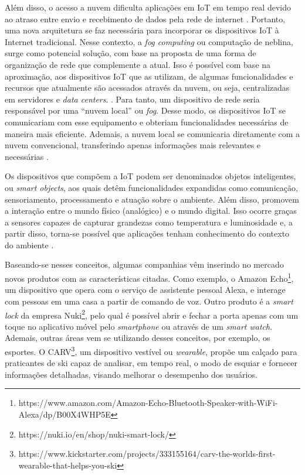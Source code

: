Além disso, o acesso a nuvem dificulta aplicações em IoT em tempo real devido ao atraso entre envio e recebimento de dados pela rede de internet \cite{Syed2016}.
Portanto, uma nova arquitetura se faz necessária para incorporar os dispositivos IoT à Internet tradicional. 
Nesse contexto, a \textit{fog computing} ou computação de neblina, surge como potencial solução, com base na proposta de uma forma de organização de rede que complemente a atual. Isso é possível com base na aproximação, aos dispositivos IoT que as utilizam, de algumas funcionalidades e recursos que atualmente são acessados através da nuvem, ou seja, centralizadas em servidores e \textit{data centers}.
\cite{Chiang2016}. Para tanto, um dispositivo de rede seria responsável por uma ``nuvem local'' ou \textit{fog}. Desse modo, os dispositivos IoT se comunicariam com esse equipamento e obteriam funcionalidades necessárias de maneira mais eficiente. Ademais, a nuvem local se comunicaria diretamente com a nuvem convencional, transferindo apenas informações mais relevantes e necessárias \cite{Syed2016}.

Os dispositivos que compõem a IoT podem ser denominados objetos inteligentes, ou \textit{smart objects}, aos quais detêm funcionalidades expandidas como comunicação, sensoriamento, processamento e atuação sobre o ambiente. Além disso, promovem a interação entre o mundo físico (analógico) e o mundo digital. Isso ocorre graças a sensores capazes de capturar grandezas como temperatura e luminosidade e, a partir disso, torna-se possível que aplicações tenham conhecimento do contexto do ambiente \cite{Stojkoska2017}. 

Baseando-se nesses conceitos, algumas companhias vêm inserindo no mercado novos produtos com as características citadas. Como exemplo, o Amazon Echo\textsuperscript{\textregistered}\footnote{https://www.amazon.com/Amazon-Echo-Bluetooth-Speaker-with-WiFi-Alexa/dp/B00X4WHP5E}, um dispositivo que opera com o serviço de assistente pessoal Alexa, e interage com pessoas em uma casa a partir de comando de voz. Outro produto é a \textit{smart lock} da empresa Nuki\textsuperscript{\textregistered}\footnote{https://nuki.io/en/shop/nuki-smart-lock/}, pelo qual é possível abrir e fechar a porta apenas com um toque no aplicativo móvel pelo \textit{smartphone} ou através de um \textit{smart watch}. Ademais, outras áreas vem se utilizando desses conceitos, por exemplo, os esportes. O CARV\textsuperscript{\textregistered}\footnote{https://www.kickstarter.com/projects/333155164/carv-the-worlds-first-wearable-that-helps-you-ski}, um dispositivo vestível ou \textit{wearable}, propõe um calçado para praticantes de ski capaz de analisar, em tempo real, o modo de esquiar e fornecer informações detalhadas, visando melhorar o desempenho dos usuários.

